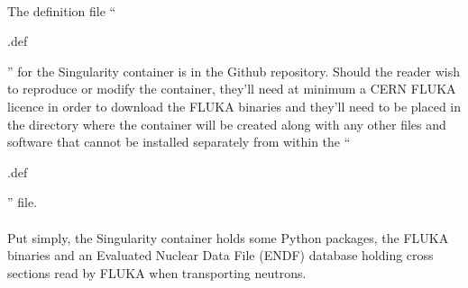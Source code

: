 \paragraph{}
The definition file ``\begin{tt}.def\end{tt}'' for the Singularity container is in the Github repository. Should the reader wish to reproduce or modify the container, they'll need at minimum a CERN FLUKA licence in order to download the FLUKA binaries and they'll need to be placed in the directory where the container will be created along with any other files and software that cannot be installed separately from within the ``\begin{tt}.def\end{tt}'' file.

\paragraph{}
Put simply, the Singularity container holds some Python packages, the FLUKA binaries and an Evaluated Nuclear Data File (ENDF) database holding cross sections read by FLUKA when transporting neutrons.